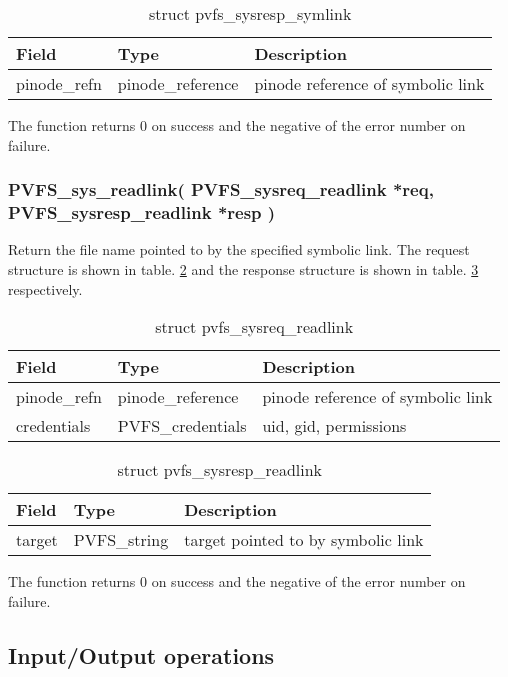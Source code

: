 \documentclass[11pt, letterpaper]{article}
\begin{document}
\begin{table}[H]
\begin{tabular}{|l|l|l|}
\hline
Field & Type & Description \\
\hline
\hline
pinode\_refn & pinode\_reference & pinode reference of symbolic link \\ 
\hline
\end{tabular}
\caption{struct pvfs\_sysresp\_symlink}\label{tab:respsym}
\end{table}

The function returns 0 on success and the negative of the error
number on failure.

\subsubsection{PVFS\_sys\_readlink(
PVFS\_sysreq\_readlink *req,
PVFS\_sysresp\_readlink *resp
)}

Return the file name pointed to by the specified symbolic link. The request
structure is shown in table. \ref{tab:reqreadlk} and the response structure
is shown in table. \ref{tab:respreadlk} respectively. 

\begin{table}[H]
\begin{tabular}{|l|l|l|}
\hline
Field & Type & Description \\
\hline
\hline
pinode\_refn & pinode\_reference & pinode reference of symbolic link \\
\hline
credentials & PVFS\_credentials & uid, gid, permissions \\
\hline
\end{tabular}
\caption{struct pvfs\_sysreq\_readlink}\label{tab:reqreadlk}
\end{table}

\begin{table}[H]
\begin{tabular}{|l|l|l|}
\hline
Field & Type & Description \\
\hline
\hline
target & PVFS\_string & target pointed to by symbolic link \\
\hline
\end{tabular}
\caption{struct pvfs\_sysresp\_readlink}\label{tab:respreadlk}
\end{table}

The function returns 0 on success and the negative of the error
number on failure.

\subsection{Input/Output operations}
\end{document}
